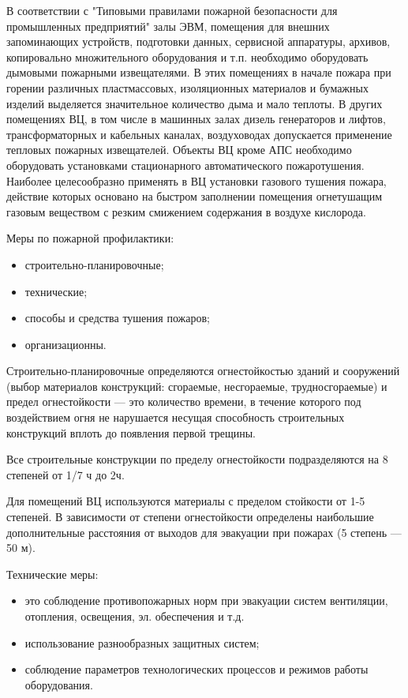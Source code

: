 В соответствии с "Типовыми правилами пожарной безопасности для промышленных предприятий" залы ЭВМ, помещения
для внешних запоминающих устройств, подготовки данных, сервисной аппаратуры, архивов, копировально множительного
оборудования и т.п. необходимо оборудовать дымовыми пожарными извещателями. В этих помещениях в начале пожара
при горении различных пластмассовых, изоляционных материалов и бумажных изделий выделяется значительное количество
дыма и мало теплоты. В других помещениях ВЦ, в том числе в машинных залах дизель генераторов и лифтов, трансформаторных
и кабельных каналах, воздуховодах допускается применение тепловых пожарных извещателей. Объекты ВЦ кроме АПС необходимо
оборудовать установками стационарного автоматического пожаротушения. Наиболее целесообразно применять в ВЦ установки
газового тушения пожара, действие которых основано на быстром заполнении помещения огнетушащим газовым веществом с
резким смижением содержания в воздухе кислорода.

Меры по пожарной профилактики:
\begin{itemize}
\item строительно-планировочные;
\item технические;
\item способы и средства тушения пожаров;
\item организационны.
\end{itemize}

Строительно-планировочные определяются огнестойкостью зданий и сооружений (выбор материалов конструкций: сгораемые, несгораемые,
трудносгораемые) и предел огнестойкости — это количество времени, в течение которого под воздействием огня не нарушается
несущая способность строительных конструкций вплоть до появления первой трещины.

Все строительные конструкции по пределу огнестойкости подразделяются на 8 степеней от 1/7 ч до 2ч.

Для помещений ВЦ используются материалы с пределом стойкости от 1-5 степеней. В зависимости от степени огнестойкости определены
наибольшие дополнительные расстояния от выходов для эвакуации при пожарах (5 степень — 50 м).

Технические меры:
\begin{itemize}
\item это соблюдение противопожарных норм при эвакуации систем вентиляции, отопления, освещения, эл. обеспечения и т.д.
\item использование разнообразных защитных систем;
\item соблюдение параметров технологических процессов и режимов работы оборудования.
\end{itemize}

